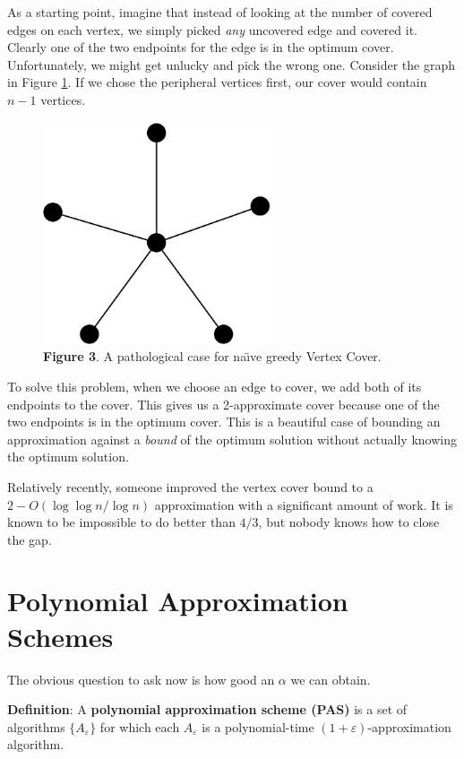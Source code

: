 \documentclass{article}
\begin{document}
As a starting point, imagine that instead of looking at the number of
covered edges on each vertex, we simply picked \textit{any} uncovered
edge and covered it.  Clearly one of the two endpoints for the edge is
in the optimum cover.  Unfortunately, we might get unlucky and pick
the wrong one.  Consider the graph in Figure \ref{fig:star}.  If we
chose the peripheral vertices first, our cover would contain $n-1$
vertices.

\begin{figure}[h]
  \centering
  \includegraphics[width=0.6\textwidth]{approx-4.png}
  \caption{\textbf{Figure 3}. A pathological case for na\"\i ve greedy Vertex Cover.}
\label{fig:star}
\end{figure}

To solve this problem, when we choose an edge to cover, we add both of
its endpoints to the cover.  This gives us a 2-approximate cover
because one of the two endpoints is in the optimum cover.  This is a
beautiful case of bounding an approximation against a \textit{bound} of
the optimum solution without actually knowing the optimum solution.

Relatively recently, someone improved the vertex cover bound to a
$2-O(\log\log n/\log n)$ approximation with a significant amount of
work.  It is known to be impossible to do better than $4/3$, but
nobody knows how to close the gap.


\section{Polynomial Approximation Schemes}

The obvious question to ask now is how good an $\alpha$ we can obtain.

\textbf{Definition}:
A \textbf{polynomial approximation scheme (PAS)} is a set of algorithms $\{ A_\varepsilon \}$ for
which each $A_\varepsilon$ is a polynomial-time $(1+\varepsilon)$-approximation algorithm.
\end{document}

